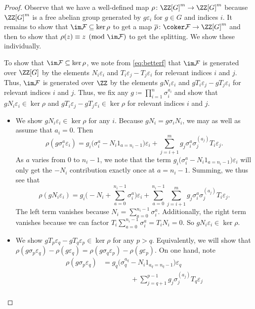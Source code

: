 \documentclass{article}
\numberwithin{equation}{section}
\begin{document}
\begin{proof}
	Observe that we have a well-defined map $\rho\colon\ZZ[G]^m\to\ZZ[G]^m$ because $\ZZ[G]^m$ is a free abelian group generated by $g\varepsilon_i$ for $g\in G$ and indices $i$. It remains to show that $\im\mathcal F\subseteq\ker\rho$ to get a map $\overline\rho\colon\coker\mathcal F\to\ZZ[G]^m$ and then to show that $\rho(z)\equiv z\pmod{\im\mathcal F}$ to get the splitting. We show these individually.

	To show that $\im\mathcal F\subseteq\ker\rho$, we note from \autoref{eq:betterf} that $\im\mathcal F$ is generated over $\ZZ[G]$ by the elements $N_i\varepsilon_i$ and $T_i\varepsilon_j-T_j\varepsilon_i$ for relevant indices $i$ and $j$. Thus, $\im\mathcal F$ is generated over $\ZZ$ by the elements $gN_i\varepsilon_i$ and $gT_i\varepsilon_j-gT_j\varepsilon_i$ for relevant indices $i$ and $j$. Thus, we fix any $g\coloneqq\prod_{i=1}^n\sigma_i^{a_i}$ and show that $gN_i\varepsilon_i\in\ker\rho$ and $gT_i\varepsilon_j-gT_j\varepsilon_i\in\ker\rho$ for relevant indices $i$ and $j$.
	\begin{itemize}
		\item We show $gN_i\varepsilon_i\in\ker\rho$ for any $i$. Because $gN_i=g\sigma_iN_i$, we may as well as assume that $a_i=0$. Then
		\[\rho\left(g\sigma_i^a\varepsilon_i\right)=g_i\big(\sigma_i^{a}-N_i1_{a=n_i-1}\big)\varepsilon_i+\sum_{j=i+1}^mg_j\sigma_i^a\sigma_j^{(a_j)}T_i\varepsilon_j.\]
		As $a$ varies from $0$ to $n_i-1$, we note that the term $g_i\big(\sigma_i^{a}-N_i1_{a=n_i-1}\big)\varepsilon_i$ will only get the $-N_i$ contribution exactly once at $a=n_i-1$. Summing, we thus see that
		\[\rho(gN_i\varepsilon_i)=g_i\Bigg(-N_i+\sum_{a=0}^{n_i-1}\sigma_i^{a}\Bigg)\varepsilon_i+\sum_{a=0}^{n_i-1}\sum_{j=i+1}^mg_j\sigma_i^a\sigma_j^{(a_j)}T_i\varepsilon_j.\]
		The left term vanishes because $N_i=\sum_{a=0}^{n_i-1}\sigma_i^a$. Additionally, the right term vanishes because we can factor $T_i\sum_{a=0}^{n_i-1}\sigma_i^a=T_iN_i=0$. So $gN_i\varepsilon_i\in\ker\rho$.
		\item We show $gT_p\varepsilon_q-gT_q\varepsilon_p\in\ker\rho$ for any $p>q$. Equivalently, we will show that $\rho(g\sigma_p\varepsilon_q)-\rho(g\varepsilon_q)=\rho(g\sigma_q\varepsilon_p)-\rho(g\varepsilon_p)$. On one hand, note
		\begin{align*}
			\rho(g\sigma_p\varepsilon_q) &= g_q\big(\sigma_q^{a_q}-N_i1_{a_q=n_q-1}\big)\varepsilon_q \\
			&\qquad\qquad+\sum_{j=q+1}^{p-1}g_j\sigma_j^{(a_j)}T_q\varepsilon_j \\

\end{align*}
\end{itemize}
\end{proof}
\end{document}
